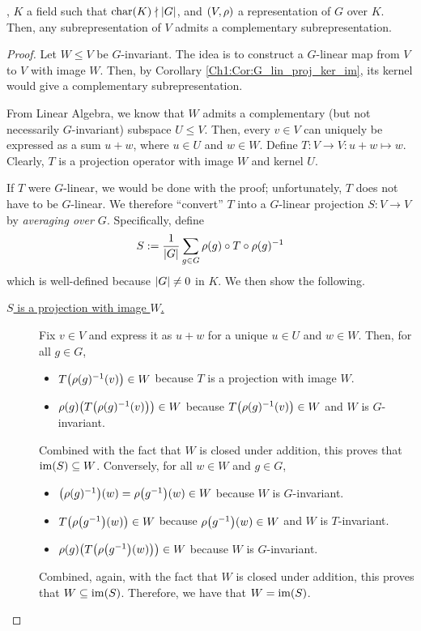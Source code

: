 \begin{boxtheorem} \label{SP:Thm:Maschke}
    , $K$ a field such that $\operatorname{char}\!\left( K \right) \nmid \left\lvert G \right\rvert$, and $\left( V, \rho \right)$ a representation of $G$ over $K$. Then, any subrepresentation of $V$ admits a complementary subrepresentation.
\end{boxtheorem}
\begin{proof}
    Let $W \leq V$ be $G$-invariant. The idea is to construct a $G$-linear map from $V$ to $V$ with image $W$. Then, by Corollary \ref{Ch1:Cor:G_lin_proj_ker_im}, its kernel would give a complementary subrepresentation.

    From Linear Algebra, we know that $W$ admits a complementary (but not necessarily $G$-invariant) subspace $U \leq V$. Then, every $v \in V$ can uniquely be expressed as a sum $u + w$, where $u \in U$ and $w \in W$. Define $T : V \to V : u + w \mapsto w$. Clearly, $T$ is a projection operator with image $W$ and kernel $U$.

    If $T$ were $G$-linear, we would be done with the proof; unfortunately, $T$ does not have to be $G$-linear. We therefore ``convert'' $T$ into a $G$-linear projection $S : V \to V$ by \textit{averaging over $G$}. Specifically, define
    \begin{align}
        S := \frac{1}{\left\lvert G \right\rvert} \sum_{g \in G} \rho(g) \circ T \circ \rho(g)^{-1} \label{Ch1:Eq:Avging_Maschke_Pf}
    \end{align}
    which is well-defined because $\left\lvert G \right\rvert \neq 0$ in $K$. We then show the following.
    \begin{description}
        \item[\underline{$S$ is a projection with image $W$.}] Fix $v \in V$ and express it as $u + w$ for a unique $u \in U$ and $w \in W$. Then, for all $g \in G$,
        \begin{itemize}[label = $-$, noitemsep]
            \item $T\!\left( \rho(g)^{-1}(v) \right) \in W$ because $T$ is a projection with image $W$.
            \item $\rho(g)\!\left( T\!\left( \rho(g)^{-1}(v) \right) \right) \in W$ because $T\!\left( \rho(g)^{-1}(v) \right) \in W$ and $W$ is $G$-invariant.
        \end{itemize}
        Combined with the fact that $W$ is closed under addition, this proves that $\operatorname{im}\!\left( S \right) \subseteq W$. Conversely, for all $w \in W$ and $g \in G$,
        \begin{itemize}[label = $-$, noitemsep]
            \item $\left( \rho(g)^{-1} \right)\!(w) = \rho\!\left( g^{-1} \right)\!(w) \in W$ because $W$ is $G$-invariant.
            \item $T\!\left(  \rho\!\left( g^{-1} \right)\!(w) \right) \in W$ because $ \rho\!\left( g^{-1} \right)\!(w) \in W$ and $W$ is $T$-invariant.
            \item $\rho(g)\!\left( T\!\left(  \rho\!\left( g^{-1} \right)\!(w) \right) \right) \in W$ because $W$ is $G$-invariant.
        \end{itemize}
        Combined, again, with the fact that $W$ is closed under addition, this proves that $W \subseteq \operatorname{im}\!\left( S \right)$. Therefore, we have that $W = \operatorname{im}\!\left( S \right)$.


\end{description}
\end{proof}
